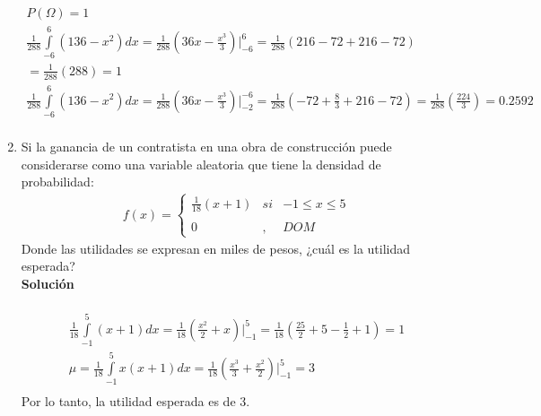 \begin{enumerate}
    \\ \\
    \begin{gather*}
    P(\Omega) = 1 \\
    \frac{1}{288} \int \limits_{-6}^{6} (136-x^2) dx 
    = \frac{1}{288}(36x - \frac{x^3}{3})  \bigg\vert_{-6}^6 = \frac{1}{288}(216 - 72 + 216 - 72) \\		
    = \frac{1}{288}(288) = 1 \\
    \frac{1}{288} \int \limits_{-6}^{6} (136-x^2) dx 
    = \frac{1}{288}(36x - \frac{x^3}{3})  \bigg\vert_{-2}^{-6} = \frac{1}{288}(-72 + \frac{8}{3} + 216 - 72) = \frac{1}{288}(\frac{224}{3}) = 0.2592 \\
    \end{gather*}
    
    \item Si la ganancia de un contratista en una obra de construcción puede considerarse como una variable aleatoria que tiene la densidad de probabilidad: \\
    \begin{align*}
    f(x)= \left\{ \begin{array}{lcc}
    \frac{1}{18}(x + 1) &   si  & -1 \leq x \leq 5 \\
    \\ 0 &  ,  & DOM
    \end{array}
    \right.
    \end{align*}
    Donde las utilidades se expresan en miles de pesos, ¿cuál es la utilidad esperada?
    \\\textbf{Solución}
    \\ \\
    \begin{gather*}
    \frac{1}{18} \int \limits_{-1}^{5} (x+1) dx = \frac{1}{18}(\frac{x^2}{2} + x) \bigg\vert_{-1}^5 = \frac{1}{18}(\frac{25}{2} + 5 - \frac{1}{2} + 1) = 1 \\
    \mu = \frac{1}{18} \int \limits_{-1}^{5} x(x+1) dx = \frac{1}{18}(\frac{x^3}{3} + \frac{x^2}{2}) \bigg\vert_{-1}^5 = 3 \\
    \end{gather*}
    Por lo tanto, la utilidad esperada es de 3. \\
    

\end{enumerate}
